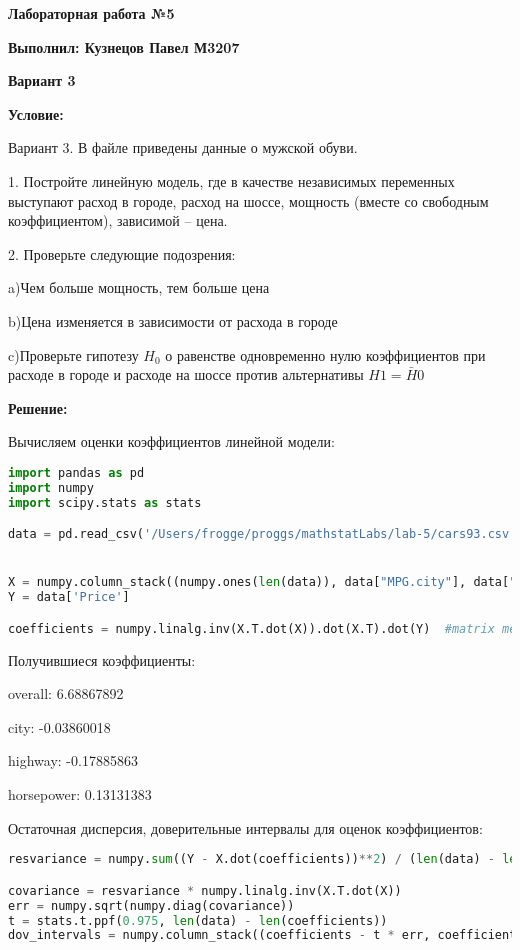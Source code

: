 \documentclass{article}
\begin{document}
\Large\textbf{Лабораторная работа №5}

\textbf{Выполнил: Кузнецов Павел М3207}

\textbf{Вариант 3}
\vspace{5mm}

\textbf{Условие:}

Вариант 3. В файле приведены данные о мужской обуви.

1. Постройте линейную модель, где в качестве независимых переменных выступают расход в городе, расход на шоссе, мощность (вместе со свободным коэффициентом), зависимой – цена.

2. Проверьте следующие подозрения:

a)Чем больше мощность, тем больше цена

b)Цена изменяется в зависимости от расхода в городе

c)Проверьте гипотезу $H_0$ о равенстве одновременно нулю коэффициентов при расходе в городе и расходе на шоссе против альтернативы $H1 = \bar H0$
\vspace{5mm}

\textbf{Решение:}

Вычисляем оценки коэффициентов линейной модели:
\begin{lstlisting}[language=Python, mathescape=true, breaklines=true]
import pandas as pd
import numpy
import scipy.stats as stats

data = pd.read_csv('/Users/frogge/proggs/mathstatLabs/lab-5/cars93.csv')


X = numpy.column_stack((numpy.ones(len(data)), data["MPG.city"], data["MPG.highway"], data["Horsepower"]))
Y = data['Price']

coefficients = numpy.linalg.inv(X.T.dot(X)).dot(X.T).dot(Y)  #matrix method
\end{lstlisting}   

Получившиеся коэффициенты:

overall: 6.68867892

city: -0.03860018

highway: -0.17885863

horsepower: 0.13131383

Остаточная дисперсия, доверительные интервалы для оценок коэффициентов:
\begin{lstlisting}[language=Python, mathescape=true, breaklines=true]
resvariance = numpy.sum((Y - X.dot(coefficients))**2) / (len(data) - len(coefficients))

covariance = resvariance * numpy.linalg.inv(X.T.dot(X))
err = numpy.sqrt(numpy.diag(covariance))
t = stats.t.ppf(0.975, len(data) - len(coefficients))
dov_intervals = numpy.column_stack((coefficients - t * err, coefficients + t * err))
\end{lstlisting} 
\end{document}
